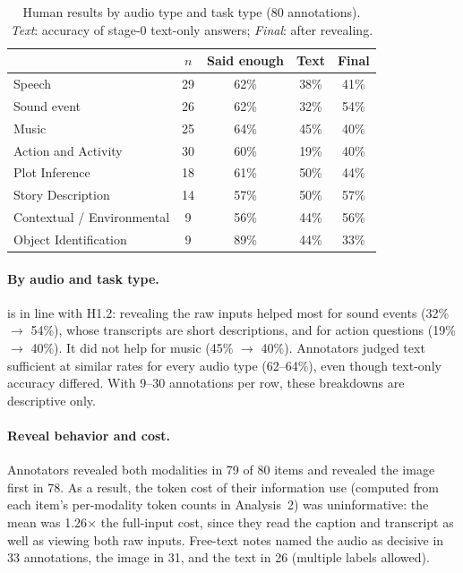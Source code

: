 \documentclass{article}
\begin{document}
\begin{table}[h]
\caption{Human results by audio type and task type (80 annotations). \emph{Text}: accuracy of stage-0
text-only answers; \emph{Final}: after revealing.}
\label{tab:app-human-breakdown}
\centering\small
\setlength{\tabcolsep}{4pt}
\begin{tabular}{lcccc}
\toprule
 & $n$ & Said enough & Text & Final \\
\midrule
Speech      & 29 & 62\% & 38\% & 41\% \\
Sound event & 26 & 62\% & 32\% & 54\% \\
Music       & 25 & 64\% & 45\% & 40\% \\
\midrule
Action and Activity          & 30 & 60\% & 19\% & 40\% \\
Plot Inference               & 18 & 61\% & 50\% & 44\% \\
Story Description            & 14 & 57\% & 50\% & 57\% \\
Contextual / Environmental   &  9 & 56\% & 44\% & 56\% \\
Object Identification        &  9 & 89\% & 44\% & 33\% \\
\bottomrule
\end{tabular}
\end{table}

\paragraph{By audio and task type.}  is in line
with H1.2: revealing the raw inputs helped most for sound events (32\% $\to$
54\%), whose transcripts are short descriptions, and for action questions
(19\% $\to$ 40\%). It did not help for music (45\% $\to$ 40\%). Annotators judged
text sufficient at similar rates for every audio type (62--64\%), even though
text-only accuracy differed. With 9--30 annotations per row, these breakdowns are
descriptive only.

\paragraph{Reveal behavior and cost.} Annotators revealed both modalities in 79
of 80 items and revealed the image first in 78. As a result, the token cost of
their information use (computed from each item's per-modality token counts in
Analysis~2) was uninformative: the mean was 1.26$\times$ the full-input cost,
since they read the caption and transcript as well as viewing both raw inputs.
Free-text notes named the audio as decisive in 33 annotations, the image in 31,
and the text in 26 (multiple labels allowed).
\end{document}

